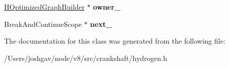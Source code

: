 \begin{DoxyCompactItemize}
\item 
\hyperlink{classv8_1_1internal_1_1_h_optimized_graph_builder}{H\+Optimized\+Graph\+Builder} $\ast$ {\bfseries owner\+\_\+}\hypertarget{classv8_1_1internal_1_1_h_optimized_graph_builder_1_1_b_a_s_e___e_m_b_e_d_d_e_d_a07f1015c266642ab866fbd19fad1633d}{}\label{classv8_1_1internal_1_1_h_optimized_graph_builder_1_1_b_a_s_e___e_m_b_e_d_d_e_d_a07f1015c266642ab866fbd19fad1633d}

\item 
Break\+And\+Continue\+Scope $\ast$ {\bfseries next\+\_\+}\hypertarget{classv8_1_1internal_1_1_h_optimized_graph_builder_1_1_b_a_s_e___e_m_b_e_d_d_e_d_aeee6540d7e83c03099abbe65c92a40e5}{}\label{classv8_1_1internal_1_1_h_optimized_graph_builder_1_1_b_a_s_e___e_m_b_e_d_d_e_d_aeee6540d7e83c03099abbe65c92a40e5}

\end{DoxyCompactItemize}


The documentation for this class was generated from the following file\+:\begin{DoxyCompactItemize}
\item 
/\+Users/joshgav/node/v8/src/crankshaft/hydrogen.\+h\end{DoxyCompactItemize}
